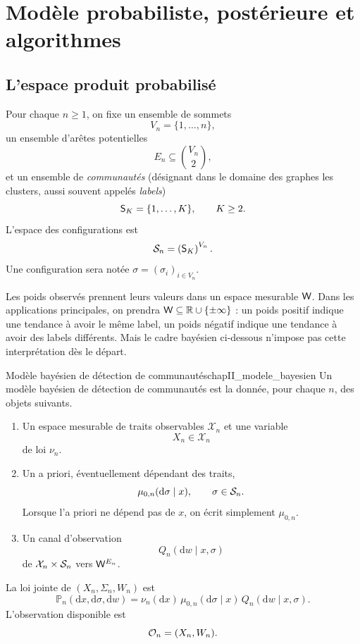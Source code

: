 \section{Modèle probabiliste, postérieure et algorithmes}
\label{sec:chapII_modele_bayesien}

\subsection{L'espace produit probabilisé}

Pour chaque $n\geq1$, on fixe un ensemble de sommets
\[
    V_n=\{1,\ldots,n\},
\]
un ensemble d'arêtes potentielles
\[
    E_n\subseteq \binom{V_n}{2},
\]
et un ensemble de \emph{communautés} (désignant dans le domaine des graphes les clusters, aussi souvent appelés \emph{labels})
\[
    \mathsf S_K=\{1,\ldots,K\},\qquad K\geq2.
\]
L'espace des configurations est
\[
    \mathcal S_n=\left(\mathsf S_K\right)^{V_n}.
\]
Une configuration sera notée $\sigma=(\sigma_i)_{i\in V_n}$.

Les poids observés prennent leurs valeurs dans un espace mesurable $\mathsf W$. Dans les applications principales, on prendra $\mathsf W\subseteq\mathbb R\cup\{\pm\infty\}$ : un poids positif indique une tendance à avoir le même label, un poids négatif indique une tendance à avoir des labels différents. Mais le cadre bayésien ci-dessous n'impose pas cette interprétation dès le départ.

\begin{Definition}{Modèle bayésien de détection de communautés}{chapII_modele_bayesien}
Un modèle bayésien de détection de communautés est la donnée, pour chaque $n$, des objets suivants.
\begin{enumerate}
    \item Un espace mesurable de traits observables $\mathcal X_n$ et une variable
    \[
        X_n\in\mathcal X_n
    \]
    de loi $\nu_n$.
    \item Un a priori, éventuellement dépendant des traits,
    \[
        \mu_{0,n}(\mathrm d\sigma\mid x),\qquad \sigma\in\mathcal S_n.
    \]
    Lorsque l'a priori ne dépend pas de $x$, on écrit simplement $\mu_{0,n}$.
    \item Un canal d'observation
    \[
        Q_n(\mathrm dw\mid x,\sigma)
    \]
    de $\mathcal X_n\times\mathcal S_n$ vers $\mathsf W^{E_n}$.
\end{enumerate}
La loi jointe de $(X_n,\Sigma_n,W_n)$ est
\begin{equation}
    \mathbb P_n(\mathrm dx,\mathrm d\sigma,\mathrm dw)
    =
    \nu_n(\mathrm dx)\,\mu_{0,n}(\mathrm d\sigma\mid x)\,Q_n(\mathrm dw\mid x,\sigma).
    \label{eq:chapII_loi_jointe_generale}
\end{equation}
L'observation disponible est
\[
    \mathcal O_n=(X_n,W_n).
\]
\end{Definition}

